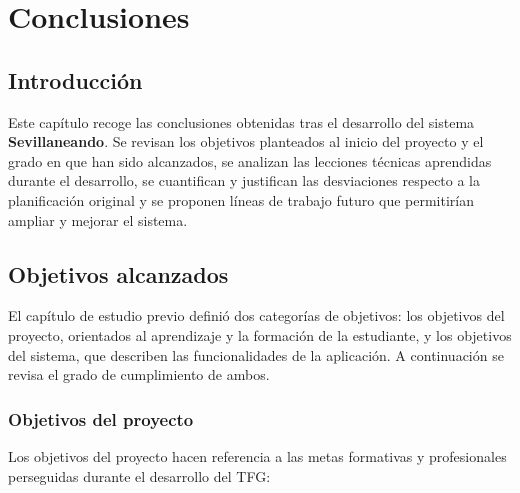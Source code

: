 \chapter{Conclusiones}\label{cap:conclusiones}

\section{Introducción}

Este capítulo recoge las conclusiones obtenidas tras el desarrollo del sistema \textbf{Sevillaneando}. Se revisan los objetivos planteados al inicio del proyecto y el grado en que han sido alcanzados, se analizan las lecciones técnicas aprendidas durante el desarrollo, se cuantifican y justifican las desviaciones respecto a la planificación original y se proponen líneas de trabajo futuro que permitirían ampliar y mejorar el sistema.

\section{Objetivos alcanzados}

El capítulo de estudio previo definió dos categorías de objetivos: los objetivos del proyecto, orientados al aprendizaje y la formación de la estudiante, y los objetivos del sistema, que describen las funcionalidades de la aplicación. A continuación se revisa el grado de cumplimiento de ambos.

\subsection{Objetivos del proyecto}

Los objetivos del proyecto hacen referencia a las metas formativas y profesionales perseguidas durante el desarrollo del TFG:

